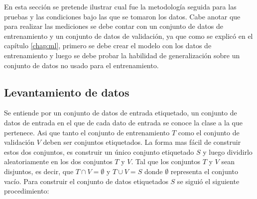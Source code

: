 \documentclass[a4paper, 11pt, oneside]{report}
\begin{document}
En esta sección se pretende ilustrar cual fue la metodología seguida para las pruebas y las condiciones bajo las que se tomaron los datos. Cabe anotar que para realizar las mediciones se debe contar con un conjunto de datos de entrenamiento y un conjunto de datos de validación, ya que como se explicó en el capítulo \ref{chap:ml}, primero se debe crear el modelo con los datos de entrenamiento y luego se debe probar la habilidad de generalización sobre un conjunto de datos no usado para el entrenamiento.

\subsection{Levantamiento de datos}

Se entiende por un conjunto de datos de entrada etiquetado, un conjunto de datos de entrada en el que de cada dato de entrada se conoce la clase a la que pertenece. Asi que tanto el conjunto de entrenamiento $T$ como el conjunto de validación $V$ deben ser conjuntos etiquetados.\newline \newline
La forma mas fácil de construir estos dos conjuntos, es construir un único conjunto etiquetado $S$ y luego dividirlo aleatoriamente en los dos conjuntos $T$ y $V$. Tal que los conjuntos $T$ y $V$ sean disjuntos, es decir, que $T \cap V = \emptyset$ y $T \cup V = S$ donde $\emptyset$ representa el conjunto vacío.\newline\newline
Para construir el conjunto de datos etiquetados $S$ se siguió el siguiente procedimiento:
\end{document}
